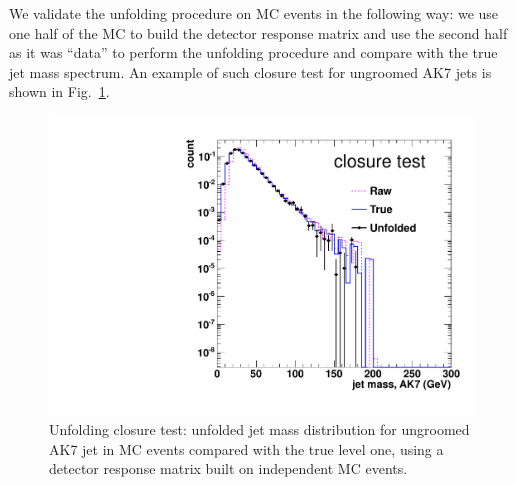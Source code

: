 We validate the unfolding procedure on MC events in the following way: we use one half of the MC to build the detector response matrix and use the second half as it was ``data'' to perform the unfolding procedure and compare with the true jet mass spectrum. An example of such closure test for ungroomed AK7 jets is shown in Fig.~\ref{figs:closure}.

\begin{figure}[!htb]
\centering
\includegraphics[width=1.0\textwidth]{figs/closureTest_ak7.pdf}
\caption{Unfolding closure test: unfolded jet mass distribution for ungroomed AK7 jet in MC events compared with the true level one, using a detector response matrix built on independent MC events.}
\label{figs:closure}
\end{figure}


~                                                                                                                           



